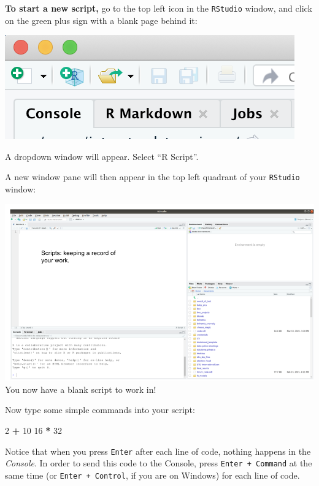 \documentclass[
]{book}
\newenvironment{Shaded}{\begin{snugshade}}{\end{snugshade}}
\newcommand{\DecValTok}[1]{\textcolor[rgb]{0.00,0.00,0.81}{#1}}
\newcommand{\OperatorTok}[1]{\textcolor[rgb]{0.81,0.36,0.00}{\textbf{#1}}}
\newcommand{\StringTok}[1]{\textcolor[rgb]{0.31,0.60,0.02}{#1}}
\begin{document}
\textbf{To start a new script,} go to the top left icon in the \texttt{RStudio} window, and click on the green plus sign with a blank page behind it:

\includegraphics{img/rstudio_newscript.png}

A dropdown window will appear. Select ``R Script''.

A new window pane will then appear in the top left quadrant of your \texttt{RStudio} window:

\includegraphics{img/rstudio_scripts.png}
You now have a blank script to work in!

Now type some simple commands into your script:

\begin{Shaded}
\begin{Highlighting}[]
\DecValTok{2}  \OperatorTok{+}\StringTok{ }\DecValTok{10}
\DecValTok{16} \OperatorTok{*}\StringTok{ }\DecValTok{32}
\end{Highlighting}
\end{Shaded}

Notice that when you press \texttt{Enter} after each line of code, nothing happens in the \emph{Console}. In order to send this code to the Console, press \texttt{Enter\ +\ Command} at the same time (or \texttt{Enter\ +\ Control}, if you are on Windows) for each line of code.
\end{document}
